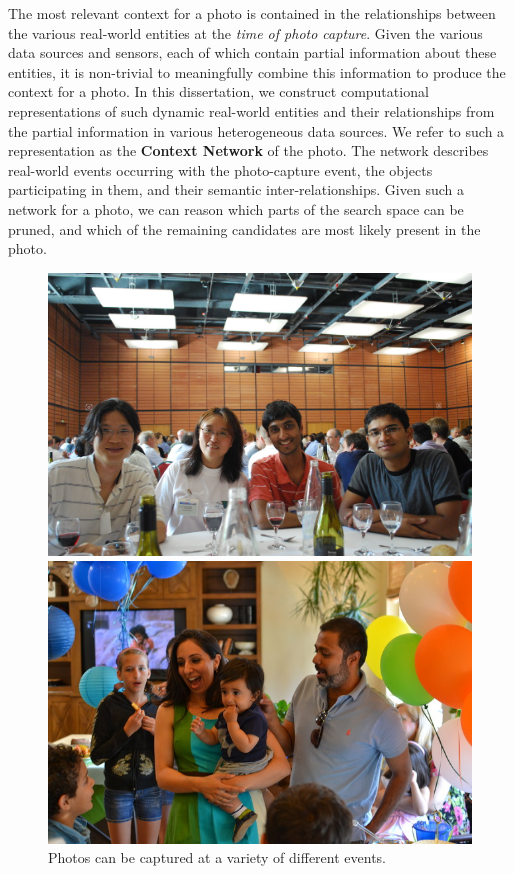The most relevant context for a photo is contained in the relationships between the various real-world entities at the \textit{time of photo capture}. Given the various data sources and sensors, each of which contain partial information about these entities, it is non-trivial to meaningfully combine this information to produce the context for a photo. In this dissertation, we construct computational representations of such dynamic real-world entities and their relationships from the partial information in various heterogeneous data sources. We refer to such a representation as the \textbf{Context Network} of the photo. The network describes real-world events occurring with the photo-capture event, the objects participating in them, and their semantic inter-relationships. Given such a network for a photo, we can reason which parts of the search space can be pruned, and which of the remaining candidates are most likely present in the photo. 

\begin{figure}[t]
\centering
\begin{minipage}[b]{0.45\linewidth}
  \includegraphics[width=\textwidth]{media/chapter1/vldb}
\end{minipage}
\begin{minipage}[b]{0.45\linewidth}
  \includegraphics[width=\textwidth]{media/chapter1/nishkas}
\end{minipage}
\caption{Photos can be captured at a variety of different events.}
\label{fig:people}
\end{figure}

